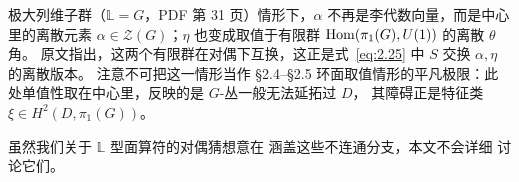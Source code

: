 \begin{yizhu}[易错点]极大列维子群（$\mathbb{L}=G$，PDF 第 31 页）情形下，$\alpha$ 不再是李代数向量，而是中心里的离散元素
$\alpha\in{\mathcal Z}(G)$；$\eta$ 也变成取值于有限群 ${\rm Hom}(\pi_1(G),U(1))$ 的离散 $\theta$ 角。
原文指出，这两个有限群在对偶下互换，这正是式~\eqref{eq:2.25} 中 $S$ 交换 $\alpha,\eta$ 的离散版本。
注意不可把这一情形当作 §2.4--§2.5 环面取值情形的平凡极限：此处单值性取在中心里，反映的是 $G$-丛一般无法延拓过 $D$，
其障碍正是特征类 $\xi\in H^2(D,\pi_1(G))$。\end{yizhu}

虽然我们关于 $\mathbb{L}$ 型面算符的对偶猜想意在
涵盖这些不连通分支，本文不会详细
讨论它们。
